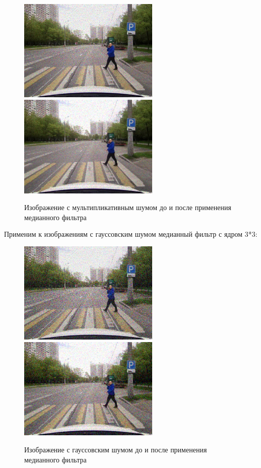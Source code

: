 \begin{figure}[hbt!]
    \centering
    \includegraphics[width=0.6\textwidth]{../outputs/image_mltp_noise.png}
    \includegraphics[width=0.6\textwidth]{../addition/image_mltp_median_filter_k3.png}
    \caption{Изображение с мультипликативным шумом до и после применения медианного фильтра}
    \label{fig:stich_images}
\end{figure}

\pagebreak
Применим к изображениям с гауссовским шумом медианный фильтр с ядром 3*3:

\begin{figure}[hbt!]
    \centering
    \includegraphics[width=0.6\textwidth]{../outputs/image_gauss_noise.png}
    \includegraphics[width=0.6\textwidth]{../addition/image_gauss_median_filter_k3.png}
    \caption{Изображение с гауссовским шумом до и после применения медианного фильтра}
    \label{fig:stich_images}
\end{figure}


